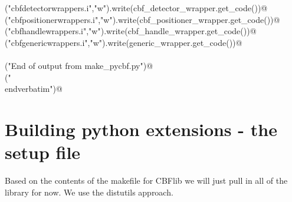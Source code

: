 \documentclass[10pt,a4paper,twoside,notitlepage]{article}
\begin{document}
\begin{flushleft}
\begin{minipage}{\linewidth}
\begin{list}{}{}
\mbox{}\verb@open("cbfdetectorwrappers.i","w").write(cbf_detector_wrapper.get_code())@\\
\mbox{}\verb@open("cbfpositionerwrappers.i","w").write(cbf_positioner_wrapper.get_code())@\\
\mbox{}\verb@open("cbfhandlewrappers.i","w").write(cbf_handle_wrapper.get_code())@\\
\mbox{}\verb@open("cbfgenericwrappers.i","w").write(generic_wrapper.get_code())@\\
\mbox{}\verb@@\\
\mbox{}\verb@print("End of output from make_pycbf.py")@\\
\mbox{}\verb@print("\\end{verbatim}")@\\
\mbox{}\verb@@{\NWsep}
\end{list}
\vspace{-1.5ex}
\footnotesize
\begin{list}{}{\setlength{\itemsep}{-\parsep}\setlength{\itemindent}{-\leftmargin}}

\item{}
\end{list}
\end{minipage}\vspace{4ex}
\end{flushleft}
\section{Building python extensions - the setup file}


Based on the contents of the makefile for CBFlib we will just 
pull in all of the library for now. We use the distutils approach.
\end{document}
